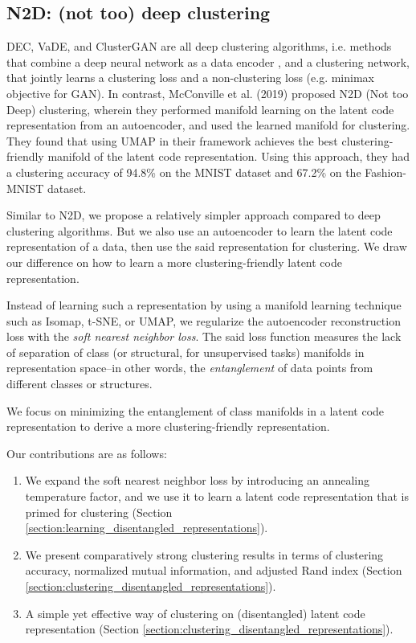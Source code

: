 \documentclass[conference]{IEEEtran}
\begin{document}
\subsection{N2D: (not too) deep clustering}
DEC\cite{xie2016unsupervised}, VaDE\cite{jiang2016variational}, and ClusterGAN\cite{mukherjee2019clustergan} are all deep clustering algorithms, i.e. methods that combine a deep neural network as a data encoder , and a clustering network, that jointly learns a clustering loss and a non-clustering loss (e.g. minimax objective for GAN). In contrast, McConville et al. (2019)\cite{mcconville2019n2d} proposed N2D (Not too Deep) clustering, wherein they performed manifold learning on the latent code representation from an autoencoder, and used the learned manifold for clustering. They found that using UMAP in their framework achieves the best clustering-friendly manifold of the latent code representation. Using this approach, they had a clustering accuracy of 94.8\% on the MNIST dataset\cite{lecun1998gradient} and 67.2\% on the Fashion-MNIST dataset\cite{xiao2017fashion}.

Similar to N2D\cite{mcconville2019n2d}, we propose a relatively simpler approach compared to deep clustering algorithms. But we also use an autoencoder to learn the latent code representation of a data, then use the said representation for clustering. We draw our difference on how to learn a more clustering-friendly latent code representation.

Instead of learning such a representation by using a manifold learning technique such as Isomap\cite{tenenbaum2000global}, t-SNE\cite{maaten2008visualizing}, or UMAP\cite{mcinnes2018umap}, we regularize the autoencoder reconstruction loss with the \textit{soft nearest neighbor loss}\cite{salakhutdinov2007learning, frosst2019analyzing}. The said loss function measures the lack of separation of class (or structural, for unsupervised tasks) manifolds in representation space--in other words, the \textit{entanglement} of data points from different classes or structures.

We focus on minimizing the entanglement of class manifolds in a latent code representation to derive a more clustering-friendly representation.

Our contributions are as follows:
\begin{enumerate}
    \item We expand the soft nearest neighbor loss by introducing an annealing temperature factor, and we use it to learn a latent code representation that is primed for clustering (Section \ref{section:learning_disentangled_representations}).
    \item We present comparatively strong clustering results in terms of clustering accuracy, normalized mutual information, and adjusted Rand index (Section \ref{section:clustering_disentangled_representations}).
    \item A simple yet effective way of clustering on (disentangled) latent code representation (Section \ref{section:clustering_disentangled_representations}).
\end{enumerate}
\end{document}
